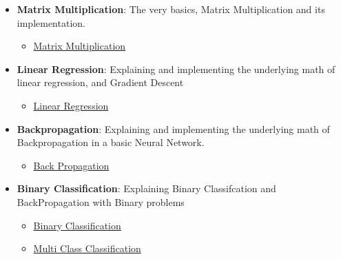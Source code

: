 \documentclass{article}
\begin{document}
\begin{itemize}
    \item \textbf{Matrix Multiplication}: The very basics, Matrix Multiplication and its implementation.
    \begin{itemize}
        \item \href{/notebooks/StartingFromTheBasicsMatrixMultiplication.ipynb}{Matrix Multiplication}
    \end{itemize}
        \item \textbf{Linear Regression}: Explaining and implementing the underlying math of linear regression, and Gradient Descent
    \begin{itemize}
        \item \href{/notebooks/StartingFromTheBasicsLinearRegression.ipynb}{Linear Regression}
    \end{itemize}
    \item \textbf{Backpropagation}: Explaining and implementing the underlying math of Backpropagation in a basic Neural Network.
    \begin{itemize}
        \item \href{/notebooks/StartingFromTheBasicsBackPropagation.ipynb}{Back Propagation}
    \end{itemize}
    \item \textbf{Binary Classification}: Explaining Binary Classifcation and BackPropagation with Binary problems
    \begin{itemize}
        \item \href{/notebooks/StartingFromTheBasicsBinaryClassification.ipynb}{Binary Classification}
    \end{itemize}
    \begin{itemize}
        \item \href{StartingFromTheBasicsMultiClassClassification.ipynb}{Multi Class Classification}
    \end{itemize}
\end{itemize}
\end{document}
